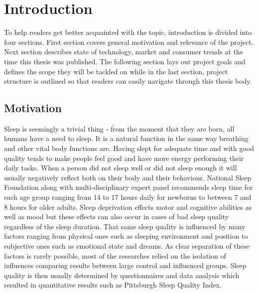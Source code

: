 \chapter{Introduction}

To help readers get better acquainted with the topic, introduction is divided into four sections. First section covers general motivation and relevance of the project. Next section describes state of technology, market and consumer trends at the time this thesis was published. The following section lays out project goals and defines the scope they will be tackled on while in the last section, project structure is outlined so that readers can easily navigate through this thesis body.


\section{Motivation}

Sleep is seemingly a trivial thing - from the moment that they are born, all humans have a need to sleep. It is a natural function in the same way breathing and other vital body functions are. Having slept for adequate time and with good quality tends to make people feel good and have more energy performing their daily tasks. When a person did not sleep well or did not sleep enough it will usually negatively reflect both on their body and their behaviour. National Sleep Foundation along with multi-disciplinary expert panel recommends sleep time for each age group ranging from 14 to 17 hours daily for newborns to between 7 and 8 hours for older adults\cite{NSF}. Sleep deprivation effects motor and cognitive abilities as well as mood but these effects can also occur in cases of bad sleep quality regardless of the sleep duration\cite{doi:10.1093/sleep/19.4.318}. That same sleep quality is influenced by many factors ranging from physical ones such as sleeping environment and position to subjective ones such as emotional state and dreams. As clear separation of these factors is rarely possible, most of the researches relied on the isolation of influences comparing results between large control and influenced groups. Sleep quality is then usually determined by questionnaires and data analysis which resulted in quantitative results such as Pittsburgh Sleep Quality Index\cite{psqi}.\\


